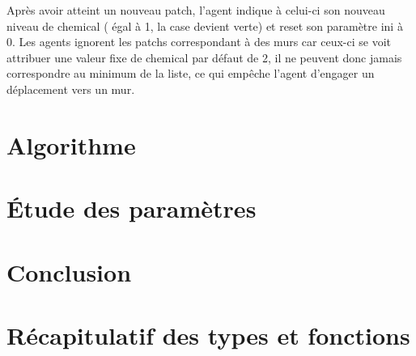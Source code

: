 \documentclass{article}
\begin{document}
Apr\`es avoir atteint un nouveau patch, l'agent indique \`a celui-ci son nouveau niveau de chemical ( \'egal \`a 1, la case devient verte) et reset son param\`etre ini \`a 0. Les agents ignorent les patchs correspondant \`a des murs car ceux-ci se voit attribuer une valeur fixe de chemical par d\'efaut de 2, il ne peuvent donc jamais correspondre au minimum de la liste, ce qui emp\^eche l'agent d'engager un d\'eplacement vers un mur.
\section{Algorithme}
    \subsection{}
\section{\'Etude des param\`etres}
    \subsection{}
\section{Conclusion}
    \subsection{}

\appendix
\newpage
\section{R\'ecapitulatif des types et fonctions}
\end{document}
